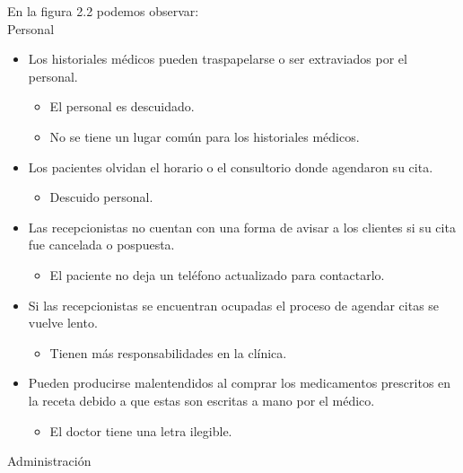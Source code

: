En la figura 2.2 podemos observar: \\
Personal
\begin{itemize}
	\item Los historiales médicos pueden traspapelarse o ser extraviados por el personal.
    \begin{itemize}
		\item El personal es descuidado.
        \item No se tiene un lugar común para los historiales médicos.
	\end{itemize}
    
    \item Los pacientes olvidan el horario o el consultorio donde agendaron su cita.
	\begin{itemize}
		\item Descuido personal.
	\end{itemize}
    
    \item Las recepcionistas no cuentan con una forma de avisar a los clientes si su cita fue cancelada o pospuesta. 
	\begin{itemize}
		\item El paciente no deja un teléfono actualizado para contactarlo.
	\end{itemize}
    
    \item Si las recepcionistas se encuentran ocupadas el proceso de agendar citas se vuelve lento.
	\begin{itemize}
		\item Tienen más responsabilidades en la clínica.
	\end{itemize}
    
    \item Pueden producirse malentendidos al comprar los medicamentos prescritos en la receta debido a que estas son escritas a mano por el médico.
	\begin{itemize}
		\item El doctor tiene una letra ilegible.  
	\end{itemize}

\end{itemize}

Administración

